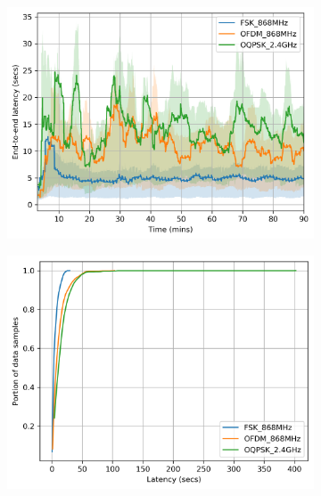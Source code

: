 \documentclass[sensors,article,submit,moreauthors,pdftex]{Definitions/mdpi}
\begin{document}
\begin{figure}[ht]

\begin{subfigure}[b]{.49\textwidth}
    	\centering
    	\includegraphics[width=1.00\columnwidth]{latency_time}
        \label{fig:latency_time}
\end{subfigure}
\hfill
\begin{subfigure}[b]{.49\textwidth}
    	\includegraphics[width=1.00\columnwidth]{latency_cdf}
        \label{fig:latency_cdf}
\end{subfigure}\vspace{2mm}


\end{figure}
\end{document}
